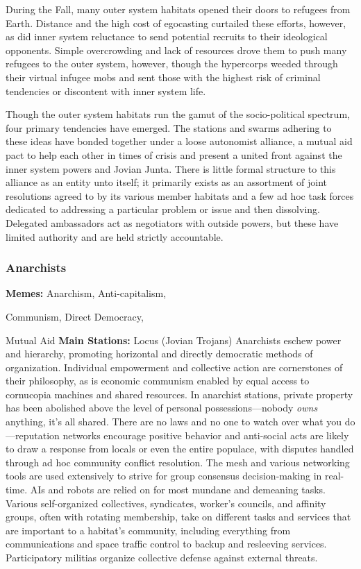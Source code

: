 During the Fall, many outer system 
habitats opened their doors to refugees 
from Earth. Distance and the high cost of 
egocasting curtailed these efforts, however, as did inner system reluctance to send 
potential recruits to their ideological opponents. Simple overcrowding and lack 
of resources drove them to push many 
refugees to the outer system, however, 
though the hypercorps weeded through 
their virtual infugee mobs and sent those 
with the highest risk of criminal tendencies or discontent with inner system life.

Though the outer system habitats run 
the gamut of the socio-political spectrum, 
four primary tendencies have emerged. 
The stations and swarms adhering to these 
ideas have bonded together under a loose 
autonomist alliance, a mutual aid pact 
to help each other in times of crisis and 
present a united front against the inner 
system powers and Jovian Junta. There is 
little formal structure to this alliance as an 
entity unto itself; it primarily exists as an 
assortment of joint resolutions agreed to 
by its various member habitats and a few 
ad hoc task forces dedicated to addressing a particular problem or issue and then 
dissolving. Delegated ambassadors act 
as negotiators with outside powers, but 
these have limited authority and are held 
strictly accountable.

\subsubsection{Anarchists}

\textbf{Memes:} Anarchism, Anti-capitalism, 

Communism, Direct Democracy, 

Mutual Aid
\textbf{Main Stations:} Locus (Jovian Trojans)
Anarchists eschew power and hierarchy, 
promoting horizontal and directly democratic methods of organization. Individual 
empowerment and collective action are 
cornerstones of their philosophy, as is 
economic communism enabled by equal 
access to cornucopia machines and shared 
resources. In anarchist stations, private 
property has been abolished above the 
level of personal possessions—nobody 
\textit{owns} anything, it's all shared. There are 
no laws and no one to watch over what 
you do—reputation networks encourage 
positive behavior and anti-social acts are likely 
to draw a response from locals or even the entire 
populace, with disputes handled through ad hoc 
community conflict resolution. The mesh and various 
networking tools are used extensively to strive for 
group consensus decision-making in real-time. AIs 
and robots are relied on for most mundane and demeaning tasks. Various self-organized collectives, syndicates, worker's councils, and affinity groups, often 
with rotating membership, take on different tasks and 
services that are important to a habitat's community, 
including everything from communications and space 
traffic control to backup and resleeving services. Participatory militias organize collective defense against 
external threats.

